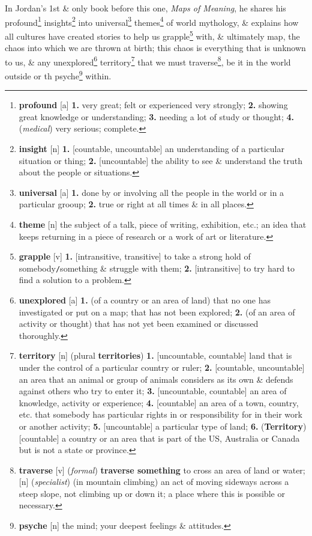 \documentclass[oneside]{book}
\numberwithin{equation}{section}
\begin{document}
In Jordan's 1st \& only book before this one, \textit{Maps of Meaning}, he shares his profound\footnote{\textbf{profound} [a] \textbf{1.} very great; felt or experienced very strongly; \textbf{2.} showing great knowledge or understanding; \textbf{3.} needing a lot of study or thought; \textbf{4.} (\textit{medical}) very serious; complete.} insights\footnote{\textbf{insight} [n] \textbf{1.} [countable, uncountable] an understanding of a particular situation or thing; \textbf{2.} [uncountable] the ability to see \& understand the truth about the people or situations.} into universal\footnote{\textbf{universal} [a] \textbf{1.} done by or involving all the people in the world or in a particular grooup; \textbf{2.} true or right at all times \& in all places.} themes\footnote{\textbf{theme} [n] the subject of a talk, piece of writing, exhibition, etc.; an idea that keeps returning in a piece of research or a work of art or literature.} of world mythology, \& explains how all cultures have created stories to help us grapple\footnote{\textbf{grapple} [v] \textbf{1.} [intransitive, transitive] to take a strong hold of somebody\texttt{/}something \& struggle with them; \textbf{2.} [intransitive] to try hard to find a solution to a problem.} with, \& ultimately map, the chaos into which we are thrown at birth; this chaos is everything that is unknown to us, \& any unexplored\footnote{\textbf{unexplored} [a] \textbf{1.} (of a country or an area of land) that no one has investigated or put on a map; that has not been explored; \textbf{2.} (of an area of activity or thought) that has not yet been examined or discussed thoroughly.} territory\footnote{\textbf{territory} [n] (plural \textbf{territories}) \textbf{1.} [uncountable, countable] land that is under the control of a particular country or ruler; \textbf{2.} [countable, uncountable] an area that an animal or group of animals considers as its own \& defends against others who try to enter it; \textbf{3.} [uncountable, countable] an area of knowledge, activity or experience; \textbf{4.} [countable] an area of a town, country, etc. that somebody has particular rights in or responsibility for in their work or another activity; \textbf{5.} [uncountable] a particular type of land; \textbf{6.} (\textbf{Territory}) [countable] a country or an area that is part of the US, Australia or Canada but is not a state or province.} that we must traverse\footnote{\textbf{traverse} [v] (\textit{formal}) \textbf{traverse something} to cross an area of land or water; [n] (\textit{specialist}) (in mountain climbing) an act of moving sideways across a steep slope, not climbing up or down it; a place where this is possible or necessary.}, be it in the world outside or th psyche\footnote{\textbf{psyche} [n] the mind; your deepest feelings \& attitudes.} within.
\end{document}
